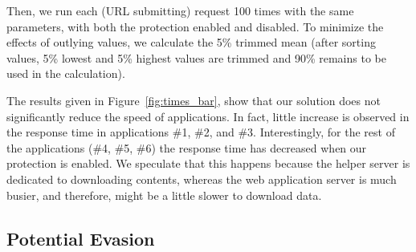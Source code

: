 Then, we run each (URL submitting) request 100 times with the same parameters, with both the protection enabled and disabled. To minimize the effects of outlying values, we calculate the 5\% trimmed mean (after sorting values, 5\% lowest and 5\% highest values are trimmed and 90\% remains to be used in the calculation). %

The results given in Figure~\ref{fig:times_bar}, show that our solution does not significantly reduce the speed of applications. In fact, little increase is observed in the response time in applications \#1, \#2, and \#3. Interestingly, for the rest of the applications (\#4, \#5, \#6) the response time has decreased when our protection is enabled. We speculate that this happens because the helper server is dedicated to downloading contents, whereas the web application server is much busier, and therefore, might be a little slower to download data. %



\subsection{Potential Evasion}

